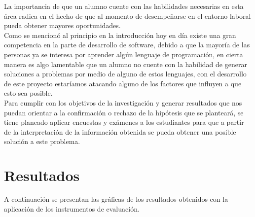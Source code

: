 \documentclass[12pt] {report}
\begin{document}
La importancia de que un alumno cuente con las habilidades necesarias en esta área radica en el hecho de que al momento de desempeñarse en el entorno laboral pueda obtener mayores oportunidades. \\ 
Como se mencionó al principio en la introducción hoy en día existe una gran competencia en la parte de desarrollo de software, debido a que la mayoría de las personas ya se interesa por aprender algún lenguaje de programación, en cierta manera es algo lamentable que un alumno no cuente con la habilidad de generar soluciones a problemas por medio de alguno de estos lenguajes, con el desarrollo de este proyecto estaríamos atacando alguno de los factores que influyen a que esto sea posible. \\
Para cumplir con los objetivos de la investigación y generar resultados que nos puedan orientar a la confirmación o rechazo de la hipótesis que se planteará, se tiene planeado aplicar encuestas y exámenes a los estudiantes para que a partir de la interpretación de la información obtenida se pueda obtener una posible solución a este problema.\\ 

\section{Resultados}
A continuación se presentan las gráficas de los resultados obtenidos con la aplicación de los instrumentos de evaluación.
\end{document}

